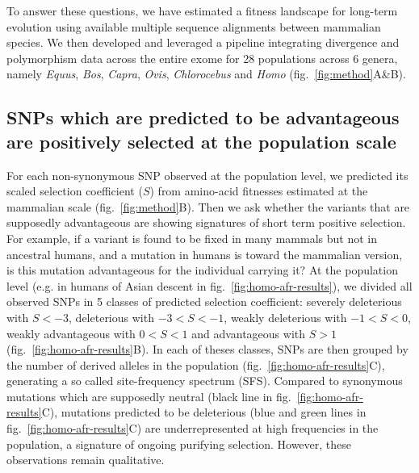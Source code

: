 \documentclass{article}
\newcommand{\Sphy}{S}
\newcommand{\divStrongDel}{\Sphy < -3}
\newcommand{\divDel}{-3 < \Sphy < -1}
\newcommand{\divWeakDel}{-1 < \Sphy < 0}
\newcommand{\divWeakAdv}{0 < \Sphy < 1}
\newcommand{\divAdv}{ \Sphy > 1}
\begin{document}
    To answer these questions, we have estimated a fitness landscape for long-term evolution using available multiple sequence alignments between mammalian species\cite{ranwez_orthomam_2007, howe_ensembl_2021}.
    We then developed and leveraged a pipeline integrating divergence and polymorphism data across the entire exome for 28 populations across 6 genera, namely \textit{Equus},  \textit{Bos}, \textit{Capra}, \textit{Ovis}, \textit{Chlorocebus} and \textit{Homo} (fig.~\ref{fig:method}A\&B).


    \subsection*{SNPs which are predicted to be advantageous are positively selected at the population scale}


    For each non-synonymous SNP observed at the population level, we predicted its scaled selection coefficient ($\Sphy$) from amino-acid fitnesses estimated at the mammalian scale (fig.~\ref{fig:method}B).
    Then we ask whether the variants that are supposedly advantageous are showing signatures of short term positive selection.
    For example, if a variant is found to be fixed in many mammals but not in ancestral humans, and a mutation in humans is toward the mammalian version, is this mutation advantageous for the individual carrying it?
    At the population level (e.g. in humans of Asian descent in fig.~\ref{fig:homo-afr-results}), we divided all observed SNPs in 5 classes of predicted selection coefficient: severely deleterious with $\divStrongDel$, deleterious with $\divDel$, weakly deleterious with $\divWeakDel$, weakly advantageous with $\divWeakAdv$ and advantageous with $\divAdv$ (fig.~\ref{fig:homo-afr-results}B).
    In each of theses classes, SNPs are then grouped by the number of derived alleles in the population (fig.~\ref{fig:homo-afr-results}C), generating a so called site-frequency spectrum (SFS).
    Compared to synonymous mutations which are supposedly neutral (black line in fig.~\ref{fig:homo-afr-results}C), mutations predicted to be deleterious (blue and green lines in fig.~\ref{fig:homo-afr-results}C) are underrepresented at high frequencies in the population, a signature of ongoing purifying selection.
    However, these observations remain qualitative.
\end{document}
